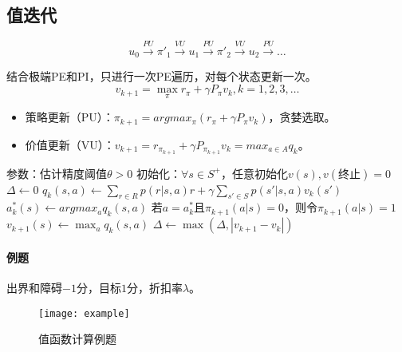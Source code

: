 \documentclass[
12pt, %
a4paper, 
oneside, %
headinclude,footinclude, %
]{scrartcl}
\begin{document}
\subsection[值迭代]{值迭代}
$$ u_0 \xrightarrow{PU} \pi'_1 \xrightarrow{VU} u_1 \xrightarrow{PU} \pi'_2 \xrightarrow{VU} u_2 \xrightarrow{PU} \dots $$

结合极端PE和PI，只进行一次PE遍历，对每个状态更新一次。
$$ v_{k + 1} = \max_{\pi} r_{\pi} + \gamma P_{\pi}v_k, k = 1, 2, 3, \dots $$
\begin{itemize}
\item 策略更新（PU）：$ \pi_{k + 1} = argmax_{\pi}(r_{\pi} + \gamma P_{\pi}v_k) $，贪婪选取。
\item 价值更新（VU）：$ v_{k + 1} = r_{\pi_{k + 1}} + \gamma P_{\pi_{k + 1}}v_k = max_{a \in A} q_k $。
\end{itemize}
\begin{myalgorithm}[值迭代]
\State 参数：估计精度阈值$ \theta > 0 $
\State 初始化：$ \forall s \in S^+ $，任意初始化$ v(s), v(\text{终止}) = 0 $
\Repeat
\State $ \Delta \gets 0 $
\State $ q_k(s, a) \gets \sum_{r \in R} p(r|s, a)r + \gamma \sum_{s' \in S} p(s'|s, a)v_k(s') $
\State $ a^*_k(s) \gets argmax_a q_k(s, a) $ 
\State 若$ a = a^*_k $且$ \pi_{k + 1}(a|s) = 0 $，则令$ \pi_{k + 1}(a|s) = 1 $ 
\State $ v_{k + 1}(s) \gets \max_a q_k(s, a) $ 
\State $ \Delta \gets \max(\Delta, |v_{k + 1} - v_k|) $ 
\EndFor
\EndFor
\Until{$ \Delta < \theta $}
\end{myalgorithm}
\paragraph{例题}
出界和障碍$ -1 $分，目标$ 1 $分，折扣率$ \lambda $。
\begin{figure}[H]
\centering 
\texttt{[image: example]} 
\caption{值函数计算例题}
\end{figure}
\end{document}

